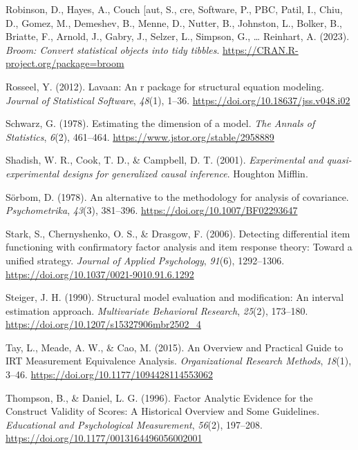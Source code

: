 \documentclass[
  man]{apa7}
\newlength{\cslhangindent}
\newlength{\cslentryspacingunit} %
\newenvironment{CSLReferences}[2] %
 {%
  \setlength{\parindent}{0pt}
  \ifodd #1
  \let\oldpar\par
  \def\par{\hangindent=\cslhangindent\oldpar}
  \fi
  \setlength{\parskip}{#2\cslentryspacingunit}
 }%
 {}
\begin{document}
\begin{CSLReferences}{1}{0}
\leavevmode{}%
Robinson, D., Hayes, A., Couch {[}aut, S., cre, Software, P., PBC, Patil, I., Chiu, D., Gomez, M., Demeshev, B., Menne, D., Nutter, B., Johnston, L., Bolker, B., Briatte, F., Arnold, J., Gabry, J., Selzer, L., Simpson, G., \ldots{} Reinhart, A. (2023). \emph{Broom: Convert statistical objects into tidy tibbles}. \url{https://CRAN.R-project.org/package=broom}

\leavevmode{}%
Rosseel, Y. (2012). Lavaan: An r package for structural equation modeling. \emph{Journal of Statistical Software}, \emph{48}(1), 1--36. \url{https://doi.org/10.18637/jss.v048.i02}

\leavevmode{}%
Schwarz, G. (1978). Estimating the dimension of a model. \emph{The Annals of Statistics}, \emph{6}(2), 461--464. \url{https://www.jstor.org/stable/2958889}

\leavevmode{}%
Shadish, W. R., Cook, T. D., \& Campbell, D. T. (2001). \emph{Experimental and quasi-experimental designs for generalized causal inference}. Houghton Mifflin.

\leavevmode{}%
Sörbom, D. (1978). An alternative to the methodology for analysis of covariance. \emph{Psychometrika}, \emph{43}(3), 381--396. \url{https://doi.org/10.1007/BF02293647}

\leavevmode{}%
Stark, S., Chernyshenko, O. S., \& Drasgow, F. (2006). Detecting differential item functioning with confirmatory factor analysis and item response theory: Toward a unified strategy. \emph{Journal of Applied Psychology}, \emph{91}(6), 1292--1306. \url{https://doi.org/10.1037/0021-9010.91.6.1292}

\leavevmode{}%
Steiger, J. H. (1990). Structural model evaluation and modification: An interval estimation approach. \emph{Multivariate Behavioral Research}, \emph{25}(2), 173--180. \url{https://doi.org/10.1207/s15327906mbr2502_4}

\leavevmode{}%
Tay, L., Meade, A. W., \& Cao, M. (2015). An Overview and Practical Guide to IRT Measurement Equivalence Analysis. \emph{Organizational Research Methods}, \emph{18}(1), 3--46. \url{https://doi.org/10.1177/1094428114553062}

\leavevmode{}%
Thompson, B., \& Daniel, L. G. (1996). Factor Analytic Evidence for the Construct Validity of Scores: A Historical Overview and Some Guidelines. \emph{Educational and Psychological Measurement}, \emph{56}(2), 197--208. \url{https://doi.org/10.1177/0013164496056002001}


\end{CSLReferences}
\end{document}
